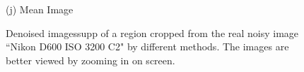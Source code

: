 \documentclass[10pt,onecolumn,letterpaper]{article}
\begin{document}
\begin{figure}[H]
{\begin{minipage}[t]{0.196\textwidth}
{\footnotesize (j) Mean Image \cite{crosschannel2016} }
\end{minipage}
}
\caption{Denoised imagessupp of a region cropped from the real noisy image ``Nikon D600 ISO 3200 C2" \cite{crosschannel2016} by different methods. The images are better viewed by zooming in on screen.} 
\label{fig14}
\end{figure}

\begin{figure}[H]\vspace{1mm}
\centering
{}
\end{figure}
\end{document}
